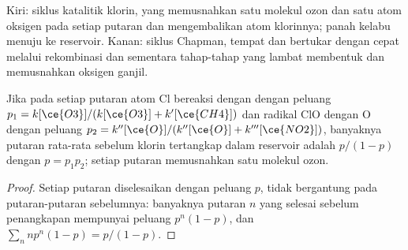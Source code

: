 \begin{omfigure}

{\small Kiri: siklus katalitik klorin, yang memusnahkan satu molekul ozon dan
satu atom oksigen pada setiap putaran dan mengembalikan atom klorinnya; panah
kelabu menuju ke reservoir. Kanan: siklus Chapman, tempat  dan 
bertukar dengan cepat melalui rekombinasi dan  sementara tahap-tahap
yang lambat membentuk dan memusnahkan oksigen ganjil.}
\end{omfigure}

\begin{proposition}\label{prop:b3:photochemistry:catalytic-destruction}
Jika pada setiap putaran atom Cl bereaksi dengan  dengan peluang $p_1 =
k[\ce{O3}]/(k[\ce{O3}] + k'[\ce{CH4}])$ dan radikal ClO dengan O dengan peluang $p_2 =
k''[\ce{O}]/(k''[\ce{O}] + k'''[\ce{NO2}])$, banyaknya putaran rata-rata sebelum klorin
tertangkap dalam reservoir adalah $p/(1 - p)$ dengan $p = p_1p_2$; setiap
putaran memusnahkan satu molekul ozon.
\end{proposition}

\begin{proof}
Setiap putaran diselesaikan dengan peluang $p$, tidak bergantung pada
putaran-putaran sebelumnya: banyaknya putaran $n$ yang selesai sebelum
penangkapan mempunyai peluang $p^n(1 -
p)$, dan $\sum_nnp^n(1 - p) = p/(1 - p)$.
\end{proof}

